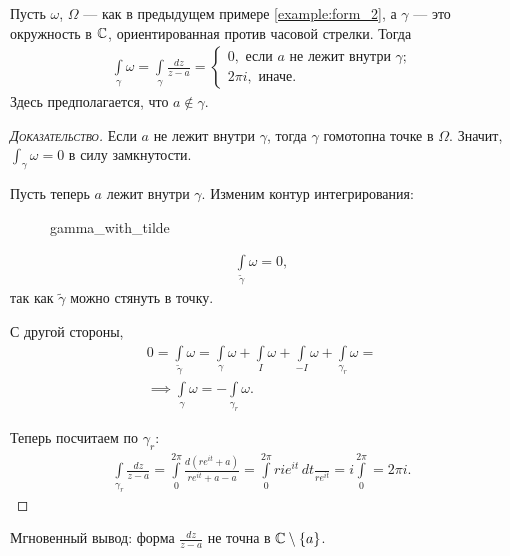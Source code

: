 \begin{exmpl}
 Пусть $\omega$, $\Omega$ --- как в предыдущем примере \ref{example:form_2}, а $\gamma$ --- это окружность в $\mathbb{C}$, ориентированная против часовой стрелки. Тогда
 \begin{align*}
  \int\limits_{\gamma} \omega = \int\limits_{\gamma} \frac{dz}{z-a} = \begin{cases}
   0, \text{ если $a$ не лежит внутри $\gamma$;}  \\
   2\pi i, \text{ иначе. }
  \end{cases} 
 \end{align*} Здесь предполагается, что $a \notin \gamma$.
\end{exmpl}
\begin{proof}[\normalfont\textsc{Доказательство}]
 Если $a$ не лежит внутри $\gamma$, тогда $\gamma$ гомотопна точке в $\Omega$. Значит, $\int_{\gamma} \omega = 0 $  в силу замкнутости.

Пусть теперь $a$  лежит внутри $\gamma$. Изменим контур интегрирования:

\begin{figure}[ht]
    \centering
    \caption{gamma_with_tilde}
    \label{fig:gamma_with_tilde}
\end{figure}

\begin{align*}
 \int\limits_{\tilde\gamma}  \omega = 0,
\end{align*} так как $\tilde\gamma$ можно стянуть в точку.

С другой стороны,
 \begin{align*}
 0 = \int\limits_{\tilde\gamma}  \omega = \int\limits_{\gamma}  \omega + \int\limits_{I}  \omega + \int\limits_{-I}   \omega + \int\limits_{\gamma_r}  \omega = \\
 \implies \int\limits_{\gamma} \omega = -\int\limits_{\gamma_r}   \omega.
\end{align*}

Теперь посчитаем по $\gamma_r$:
 \begin{align*}
 \int\limits_{\gamma_r} \frac{dz}{z - a}  = \int\limits_{0}^{2\pi}   \frac{d(re^{it} + a)}{r e^{it} + a - a} = \int\limits_{0}^{2\pi} r i e^{it}\,dt \frac{}{r e^{it}} = i \int\limits_{0}^{2\pi} = 2\pi i.
\end{align*} 

\end{proof}

Мгновенный вывод: форма $\frac{dz}{z - a}$ не точна в $\mathbb{C} \setminus \left\{ a \right\}$.

